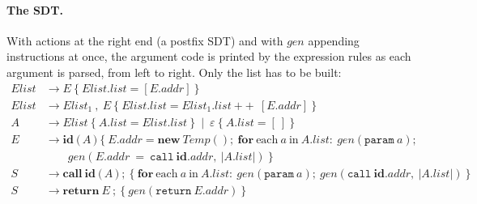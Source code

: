 \documentclass[11pt,a4paper]{article}
\newcommand{\at}[2]{\ensuremath{#1.\mathit{#2}}}
\newcommand{\tok}[1]{\ensuremath{\mathtt{#1}}}
\begin{document}
\paragraph{The SDT.} With actions at the right end (a postfix SDT) and with $\mathit{gen}$ appending instructions at once, the argument code is printed by the expression rules as each argument is parsed, from left to right. Only the list has to be built:
\begin{align*}
\mathit{Elist} &\to E\ \{\ \at{Elist}{list}=[\at{E}{addr}]\ \}\\
\mathit{Elist} &\to \mathit{Elist}_1\ \tok{,}\ E\ \{\ \at{Elist}{list}=\at{Elist_1}{list}\ \mathbin{+\!\!+}\ [\at{E}{addr}]\ \}\\
A &\to \mathit{Elist}\ \{\ \at{A}{list}=\at{Elist}{list}\ \}\ \mid\ \varepsilon\ \{\ \at{A}{list}=[\ ]\ \}\\
E &\to \mathbf{id}\ \tok{(}\,A\,\tok{)}\ \{\ \at{E}{addr}=\mathbf{new}\ \mathit{Temp}();\ \mathbf{for}\ \text{each}\ a\ \text{in}\ \at{A}{list}:\ \mathit{gen}(\tok{param}\ a);\\
 &\qquad\mathit{gen}(\at{E}{addr}\ \tok{=}\ \tok{call}\ \at{\mathbf{id}}{addr},\ |\at{A}{list}|)\ \}\\
S &\to \mathbf{call}\ \mathbf{id}\ \tok{(}\,A\,\tok{)}\ \tok{;}\ \{\ \mathbf{for}\ \text{each}\ a\ \text{in}\ \at{A}{list}:\ \mathit{gen}(\tok{param}\ a);\ \mathit{gen}(\tok{call}\ \at{\mathbf{id}}{addr},\ |\at{A}{list}|)\ \}\\
S &\to \mathbf{return}\ E\ \tok{;}\ \{\ \mathit{gen}(\tok{return}\ \at{E}{addr})\ \}
\end{align*}
\end{document}
